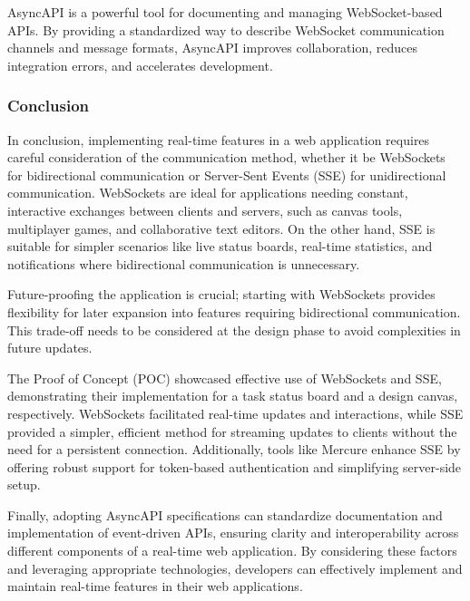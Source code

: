 AsyncAPI is a powerful tool for documenting and managing WebSocket-based APIs. By providing a standardized way to describe WebSocket communication channels and message formats, AsyncAPI improves collaboration, reduces integration errors, and accelerates development.

\subsubsection{Conclusion}

In conclusion, implementing real-time features in a web application requires careful consideration of the communication method, whether it be WebSockets for bidirectional communication or Server-Sent Events (SSE) for unidirectional communication. WebSockets are ideal for applications needing constant, interactive exchanges between clients and servers, such as canvas tools, multiplayer games, and collaborative text editors. On the other hand, SSE is suitable for simpler scenarios like live status boards, real-time statistics, and notifications where bidirectional communication is unnecessary.

Future-proofing the application is crucial; starting with WebSockets provides flexibility for later expansion into features requiring bidirectional communication. This trade-off needs to be considered at the design phase to avoid complexities in future updates.

The Proof of Concept (POC) showcased effective use of WebSockets and SSE, demonstrating their implementation for a task status board and a design canvas, respectively. WebSockets facilitated real-time updates and interactions, while SSE provided a simpler, efficient method for streaming updates to clients without the need for a persistent connection. Additionally, tools like Mercure enhance SSE by offering robust support for token-based authentication and simplifying server-side setup.

Finally, adopting AsyncAPI specifications can standardize documentation and implementation of event-driven APIs, ensuring clarity and interoperability across different components of a real-time web application. By considering these factors and leveraging appropriate technologies, developers can effectively implement and maintain real-time features in their web applications.
